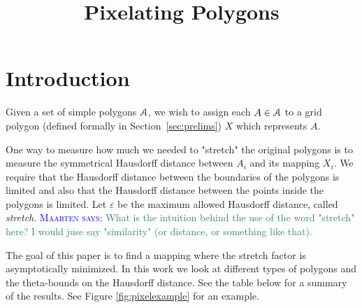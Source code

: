 \documentclass[a4paper, UKenglish]{lipics-v2018}
\title{Pixelating Polygons}
\newcommand{\mremark}[3]{\textcolor{blue}{\textsc{#1 #2:}} \textcolor{SeaGreen}{\textsf{#3}}}
\newcommand{\maarten}[2][says]{\mremark{Maarten}{#1}{#2}}
\newcommand{\pix}{\square}
\newcommand{\eps}{\varepsilon}
\begin{document}
\maketitle

\section{Introduction}

Given a set of simple polygons $\cal A$, we wish to assign each $A \in \cal A$ to a grid polygon (defined formally in Section~\ref {sec:prelims}) $X$ which represents $A$.




One way to measure how much we needed to "stretch" the original polygons is to measure the symmetrical Hausdorff distance between $A_i$ and its mapping $X_i$. 
We require that the Hausdorff distance between the boundaries of the polygons is limited and also that the Hausdorff distance between the points inside the polygons is limited.
Let $\eps$ be the maximum allowed Hausdorff distance, called \emph{stretch}.
\maarten {What is the intuition behind the use of the word "stretch" here? I would juse say "similarity" (or distance, or something like that).}

The goal of this paper is to find a mapping where the stretch factor is asymptotically minimized. In this work we look at different types of polygons and the theta-bounds on the Hausdorff distance. See the table below for a summary of the results.
See Figure \ref{fig:pixelexample} for an example.
\end{document}
